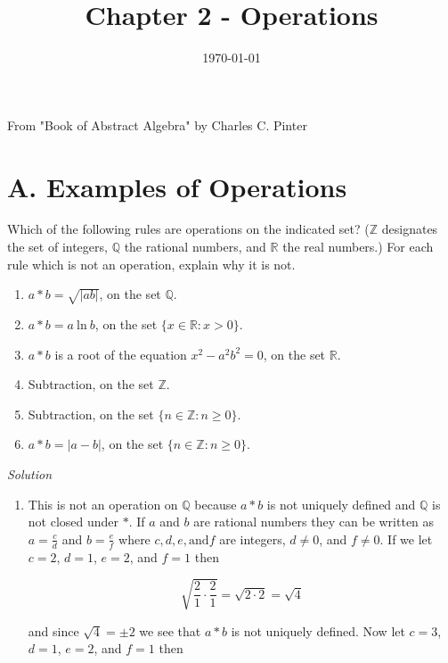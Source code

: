 \documentclass[12pt]{article}
\begin{document}
\title{ Chapter 2 - Operations }

\date{\today}
\maketitle
\begin{flushleft}
From "Book of Abstract Algebra" by Charles C. Pinter

\section*{A. Examples of Operations}

Which of the following rules are operations on the indicated set? ($\mathbb{Z}$ designates the set of integers, $\mathbb{Q}$ the rational numbers, and $\mathbb{R}$ the real numbers.) For each rule which is not an operation, explain why it is not.

\begin{enumerate}



\item $a * b = \sqrt{|ab|}$, on the set $\mathbb{Q}$.
\item $a * b = a~\text{ln}~b$, on the set $\{x \in \mathbb{R}: x > 0\}$.
\item $a * b$ is a root of the equation $x^{2} - a^{2}b^{2} = 0$, on the set $\mathbb{R}$.
\item Subtraction, on the set $\mathbb{Z}$.
\item Subtraction, on the set $\{ n \in \mathbb{Z}:n \geq 0 \}$.
\item $a * b = |a-b|$, on the set $\{ n \in \mathbb{Z}: n \geq 0 \}$.

\end{enumerate}

\textit{Solution} \\
\begin{enumerate}
\item This is not an operation on $\mathbb{Q}$ because $a * b$ is not uniquely defined and $\mathbb{Q}$ is not closed under $*$. If $a$ and $b$ are rational numbers they can be written as $a = \frac{c}{d}$ and $b = \frac{e}{f}$ where $c, d, e, \text{and} f$ are integers, $d \neq 0$, and $f \neq 0$. If we let $c = 2$, $d = 1$, $e = 2$, and $f = 1$ then

$$ \sqrt{ \frac{2}{1} \cdot \frac{2}{1} } = \sqrt{ 2 \cdot 2 } = \sqrt{4}$$  

and since $ \sqrt{4} = \pm 2$ we see that $a * b$ is not uniquely defined. Now let $c = 3$, $d = 1$, $e = 2$, and $f = 1$ then


\end{enumerate}
\end{flushleft}
\end{document}
